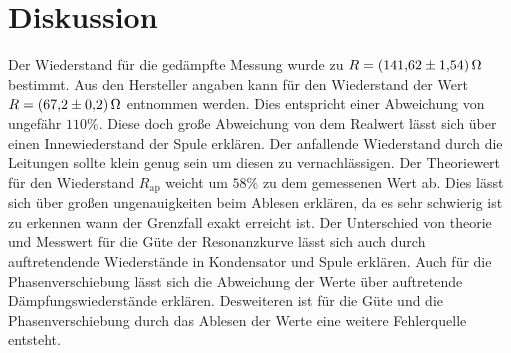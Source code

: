 \section{Diskussion}
\label{sec:Diskussion}
Der Wiederstand für die gedämpfte Messung wurde zu $R=\SI{141.62\pm1.54}{\ohm}$ bestimmt. Aus den Hersteller angaben kann für den Wiederstand der Wert $R=\SI{67.2\pm0.2}{\ohm}$ entnommen werden.
Dies entspricht einer Abweichung von ungefähr $110\%$. Diese doch große Abweichung von dem Realwert lässt sich über einen Innewiederstand der Spule erklären.
Der anfallende Wiederstand durch die Leitungen sollte klein genug sein um diesen zu vernachlässigen.
Der Theoriewert für den Wiederstand $R_\text{ap}$ weicht um $58\%$ zu dem gemessenen Wert ab. Dies lässt sich über großen ungenauigkeiten beim Ablesen erklären, da es sehr schwierig ist zu erkennen wann der Grenzfall exakt erreicht ist.
Der Unterschied von theorie und Messwert für die Güte der Resonanzkurve lässt sich auch durch auftretendende Wiederstände in Kondensator und Spule erklären.
Auch für die Phasenverschiebung lässt sich die Abweichung der Werte über auftretende Dämpfungswiederstände erklären.
Desweiteren ist für die Güte und die Phasenverschiebung durch das Ablesen der Werte eine weitere Fehlerquelle entsteht. 
